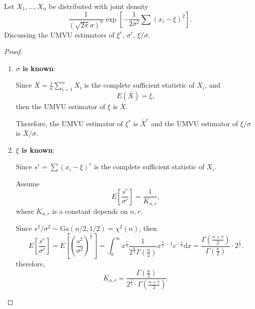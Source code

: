 \begin{example}
    Let $X_{1},\ldots,X_{n}$ be distributed with joint density
    \begin{equation}
        \frac{1}{(\sqrt{2\pi}\sigma)^{n}}\exp\left[-\frac{1}{2\sigma^{2}}\sum\left(x_{i}-\xi\right)^{2}\right].
    \end{equation}
    Discussing the UMVU estimators of $\xi^r$, $\sigma^r$, $\xi/\sigma$.
\end{example}

\begin{proof}
    \begin{enumerate}
        \item \textbf{$\sigma$ is known}:

              Since $\bar{X}=\frac{1}{n}\sum_{i=1}^{n}X_i$ is the complete sufficient statistic of $X_i$, and
              \begin{equation*}
                  E(\bar{X})=\xi,
              \end{equation*}
              then the UMVU estimator of $\xi$ is $\bar{X}$.

              Therefore, the UMVU estimator of $\xi^r$ is $\bar{X}^r$ and the UMVU estimator of $\xi/\sigma$ is $\bar{X}/\sigma$.

        \item \textbf{$\xi$ is known}:

              Since $s^r=\sum\left(x_{i}-\xi\right)^r$ is the complete sufficient statistic of $X_i$.

              Assume
              \begin{equation*}
                  E\left[\frac{s^r}{\sigma^r}\right]=\frac{1}{K_{n,r}},
              \end{equation*}
              where $K_{n,r}$ is a constant depends on $n,r$.

              Since $s^2/\sigma^2\sim\text{Ga}(n/2,1/2)=\chi^2(n)$, then
              \begin{equation*}
                  E\left[\frac{s^r}{\sigma^r}\right]=E\left[\left(\frac{s^2}{\sigma^2}\right)^{\frac{r}{2}}\right]=\int_{0}^{\infty}x^{\frac{r}{2}}\frac{1}{2^{\frac{n}{2}}\Gamma(\frac{n}{2})}x^{\frac{n}{2}-1}e^{-\frac{x}{2}}\mathrm{d}x=\frac{\Gamma\left(\frac{n+r}{2}\right)}{\Gamma(\frac{n}{2})}\cdot 2^{\frac{r}{2}}.
              \end{equation*}
              therefore,
              \begin{equation*}
                  K_{n,r}=\frac{\Gamma(\frac{n}{2})}{2^{\frac{r}{2}}\cdot\Gamma\left(\frac{n+r}{2}\right)}.
              \end{equation*}


\end{enumerate}
\end{proof}
